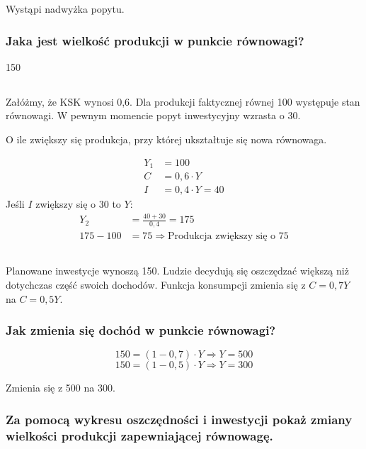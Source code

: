 \documentclass[a4paper,12pt]{article}
\begin{document}
Wystąpi nadwyżka popytu.

\subsubsection{Jaka jest wielkość produkcji w punkcie równowagi?}

150

\subsection{}

Załóżmy, że KSK wynosi 0,6. Dla produkcji faktycznej równej 100 występuje stan równowagi. W pewnym momencie popyt inwestycyjny wzrasta o 30.

O ile zwiększy się produkcja, przy której ukształtuje się nowa równowaga.

\begin{align*}
	Y_1 &= 100 \\
	C &= 0,6 \cdot Y \\
	I &= 0,4 \cdot Y = 40
\end{align*}
Jeśli $I$ zwiększy się o 30 to $Y$:
\begin{align*}
	Y_2 &= \frac{40 + 30}{0,4} = 175 \\
	175 - 100 &= 75 \Rightarrow \text{Produkcja zwiększy się o 75}
\end{align*}

\subsection{}

Planowane inwestycje wynoszą 150. Ludzie decydują się oszczędzać większą niż dotychczas część swoich dochodów. Funkcja konsumpcji zmienia się z $C = 0,7Y$ na $C = 0,5Y$.

\subsubsection{Jak zmienia się dochód w punkcie równowagi?}

\[150 = \left(1 - 0,7\right)\cdot Y \Rightarrow Y = 500\]
\[150 = \left(1 - 0,5\right)\cdot Y \Rightarrow Y = 300\]

Zmienia się z 500 na 300.

\subsubsection{Za pomocą wykresu oszczędności i inwestycji pokaż zmiany wielkości produkcji zapewniającej równowagę.}
\end{document}
